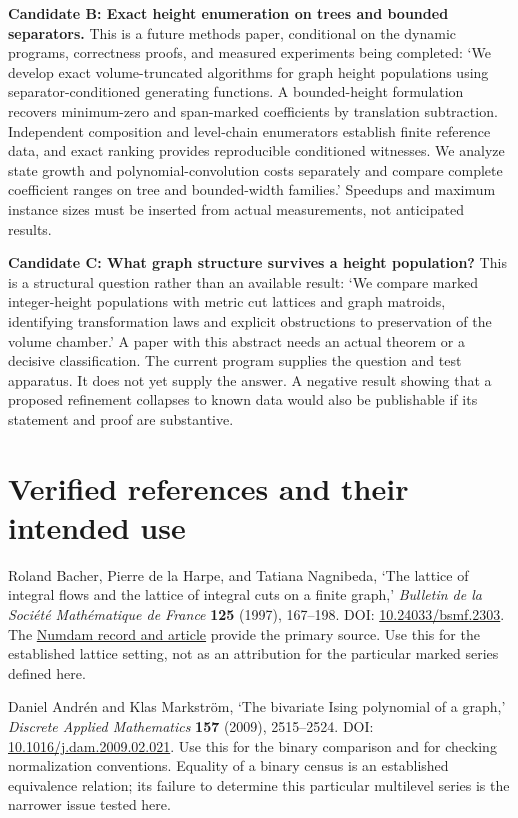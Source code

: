 \documentclass[
  11pt,
  a4paper,
]{report}
\begin{document}
\textbf{Candidate B: Exact height enumeration on trees and bounded
separators.} This is a future methods paper, conditional on the dynamic
programs, correctness proofs, and measured experiments being completed:
`We develop exact volume-truncated algorithms for graph height
populations using separator-conditioned generating functions. A
bounded-height formulation recovers minimum-zero and span-marked
coefficients by translation subtraction. Independent composition and
level-chain enumerators establish finite reference data, and exact
ranking provides reproducible conditioned witnesses. We analyze state
growth and polynomial-convolution costs separately and compare complete
coefficient ranges on tree and bounded-width families.' Speedups and
maximum instance sizes must be inserted from actual measurements, not
anticipated results.

\textbf{Candidate C: What graph structure survives a height population?}
This is a structural question rather than an available result: `We
compare marked integer-height populations with metric cut lattices and
graph matroids, identifying transformation laws and explicit
obstructions to preservation of the volume chamber.' A paper with this
abstract needs an actual theorem or a decisive classification. The
current program supplies the question and test apparatus. It does not
yet supply the answer. A negative result showing that a proposed
refinement collapses to known data would also be publishable if its
statement and proof are substantive.

\hypertarget{verified-references-and-their-intended-use}{%
\section{Verified references and their intended
use}\label{verified-references-and-their-intended-use}}

Roland Bacher, Pierre de la Harpe, and Tatiana Nagnibeda, `The lattice
of integral flows and the lattice of integral cuts on a finite graph,'
\emph{Bulletin de la Société Mathématique de France} \textbf{125}
(1997), 167--198. DOI:
\href{https://doi.org/10.24033/bsmf.2303}{10.24033/bsmf.2303}. The
\href{https://www.numdam.org/item/BSMF_1997__125_2_167_0/}{Numdam record
and article} provide the primary source. Use this for the established
lattice setting, not as an attribution for the particular marked series
defined here.

Daniel Andrén and Klas Markström, `The bivariate Ising polynomial of a
graph,' \emph{Discrete Applied Mathematics} \textbf{157} (2009),
2515--2524. DOI:
\href{https://doi.org/10.1016/j.dam.2009.02.021}{10.1016/j.dam.2009.02.021}.
Use this for the binary comparison and for checking normalization
conventions. Equality of a binary census is an established equivalence
relation; its failure to determine this particular multilevel series is
the narrower issue tested here.
\end{document}
